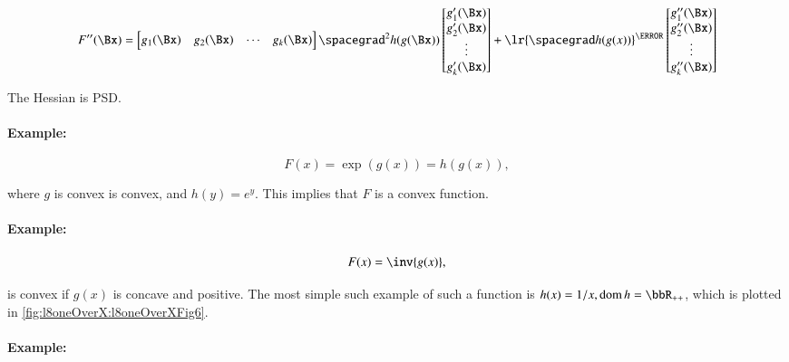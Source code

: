 \begin{dmath}\label{eqn:convexOptimizationLecture8:240}
F''(\Bx)
=
\begin{bmatrix}
g_1(\Bx) & g_2(\Bx) & \cdots & g_k(\Bx)
\end{bmatrix}
\spacegrad^2 h(g(\Bx))
\begin{bmatrix}
g_1'(\Bx) \\ g_2'(\Bx) \\ \vdots \\ g_k'(\Bx)
\end{bmatrix}
+
\lr{ \spacegrad h(g(x)) }^\T
\begin{bmatrix}
g_1''(\Bx) \\ g_2''(\Bx) \\ \vdots \\ g_k''(\Bx)
\end{bmatrix}
\end{dmath}

The Hessian is PSD.

\paragraph{Example:}

\begin{dmath}\label{eqn:convexOptimizationLecture8:260}
F(x) = \exp( g(x) ) = h( g(x) ),
\end{dmath}

where \( g \) is convex is convex, and \( h(y) = e^y \).  This implies that \( F \) is a convex function.

\paragraph{Example:}

\begin{dmath}\label{eqn:convexOptimizationLecture8:280}
F(x) = \inv{g(x)},
\end{dmath}

is convex if \( g(x) \) is concave and positive.  The most simple such example of such a function is \( h(x) = 1/x, \dom h = \bbR_{++} \), which is plotted in \cref{fig:l8oneOverX:l8oneOverXFig6}.


\paragraph{Example:}


